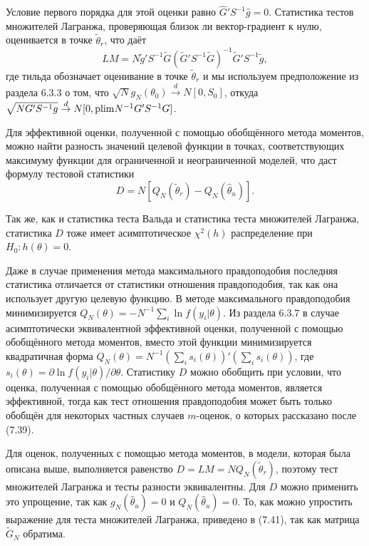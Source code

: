Условие первого порядка для этой оценки равно $\hat{G}'S^{-1}\hat{g} = 0$. Статистика тестов множителей Лагранжа, проверяющая близок ли вектор-градиент к нулю, оценивается в точке $\tilde{\theta}_r$, что даёт
\begin{equation}
LM = N\tilde{g}'S^{-1}\tilde{G}(\tilde{G}'S^{-1}\tilde{G})^{-1}\tilde{G}'S^{-1}\tilde{g},
\end{equation}
где тильда обозначает оценивание в точке $\tilde{\theta}_r$ и мы используем предположение из раздела 6.3.3 о том, что $\sqrt{N}g_N(\theta_0) \stackrel{d}{\rightarrow} N[0, S_0]$, откуда $\sqrt{N G'S^{-1}g} \stackrel{d}{\rightarrow} N[0, \mathrm{plim } N^{-1}G'S^{-1}G]$.

Для эффективной оценки, полученной с помощью обобщённого метода моментов, можно найти разность значений целевой функции в точках, соответствующих максимуму функции для ограниченной и неограниченной моделей, что даст формулу тестовой статистики
\begin{equation}
D = N[Q_N(\tilde{\theta}_r) - Q_N(\hat{\theta}_u)].
\end{equation}

Так же, как и статистика теста Вальда и статистика теста множителей Лагранжа, статистика $D$ тоже имеет асимптотическое $\chi^2(h)$ распределение при $H_0: h(\theta) = 0$.

Даже в случае применения метода максимального правдоподобия последняя статистика отличается от статистики отношения правдоподобия, так как она использует другую целевую функцию. В методе максимального правдоподобия минимизируется $Q_N(\theta) = - N^{-1}\sum_i \ln f(y_i|\theta)$. Из раздела 6.3.7 в случае асимптотически эквивалентной эффективной оценки, полученной с помощью обобщённого метода моментов, вместо этой функции минимизируется квадратичная форма  $Q_N(\theta) = N^{-1}(\sum_i s_i(\theta))'(\sum_i s_i(\theta))$, где $s_i(\theta) = \partial{\ln f(y_i|\theta)}/\partial{\theta}$. Статистику $D$ можно обобщить при условии, что оценка, полученная с помощью обобщённого метода моментов, является эффективной, тогда как тест отношения правдоподобия может быть только обобщён для некоторых частных случаев $m$-оценок, о которых рассказано после (7.39).

Для оценок, полученных с помощью метода моментов, в модели, которая была описана выше, выполняется равенство $D = LM = NQ_N(\tilde{\theta}_r)$, поэтому тест множителей Лагранжа и тесты разности эквивалентны. Для $D$ можно применить это упрощение, так как $g_N(\hat{\theta}_u) = 0$ и $Q_N(\hat{\theta}_u) = 0$. То, как можно упростить выражение для теста множителей Лагранжа, приведено в (7.41), так как матрица $\tilde{G}_N$ обратима.

